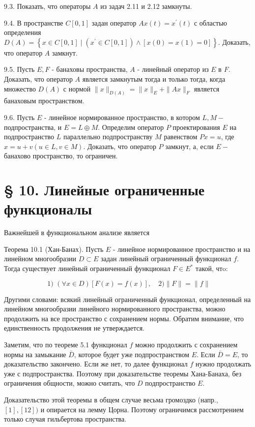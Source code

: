 9.3. Показать, что операторы $A$ из задач 2.11 и 2.12 замкнуты.

9.4. В пространстве $C[0,1]$ задан оператор $A x(t)=x^{\prime}(t)$ с областью определения $D(A)=\left\{x \in C[0,1] \mid\left(x^{\prime} \in C[0,1]\right) \wedge[x(0)=x(1)=0]\right\}$. Доказать, что оператор $A$ замкнут.

9.5. Пусть $E, F$ - банаховы пространства, $A$ - линейный оператор из $E$ в $F$. Доказать, что оператор $A$ является замкнутым тогда и только тогда, когда множество $D(A)$ с нормой $\|x\|_{D(A)}=\|x\|_{E}+\|A x\|_{F}$ является банаховым пространством.

9.6. Пусть $E$ - линейное нормированное пространство, в котором $L, M-$ подпространства, и $E=L \oplus M$. Определим оператор $P$ проектирования $E$ на подпространство $L$ параллельно подпространству $M$ равенством $P x=u$, где $x=u+v(u \in L, v \in M)$. Доказать, что оператор $P$ замкнут, а, если $E-$ банахово пространство, то ограничен.

\section*{§ 10. Линейные ограниченные функционалы}
Важнейшей в функциональном анализе является

Теорема 10.1 (Хан-Банах). Пусть $E$ - линейное нормированное пространство и на линейном многообразии $D \subset E$ задан линейный ограниченный функционал $f$. Тогда существует линейный ограниченный функционал $F \in E^{*}$ такой, чтo:

\[
\text { 1) }(\forall x \in D)[F(x)=f(x)], \quad 2)\|F\|=\|f\|
\]

Другими словами: всякий линейный ограниченный функционал, определенный на линейном многообразии линейного нормированного пространства, можно продолжить на все пространство с сохранением нормы. Обратим внимание, что единственность продолжения не утверждается.

Заметим, что по теореме 5.1 функционал $f$ можно продолжить с сохранением нормы на замыкание $\bar{D}$, которое будет уже подпространством $E$. Если $\bar{D}=E$, то доказательство закончено. Если же нет, то далее функционал $f$ нужно продолжать уже с подпространства. Поэтому при доказательстве теоремы Хана-Банаха, без ограничения общности, можно считать, что $D$ подпространство $E$.

Доказательство этой теоремы в общем случае весьма громоздко (напр., $[1],[12])$ и опирается на лемму Цорна. Поэтому ограничимся рассмотрением только случая гильбертова пространства.

